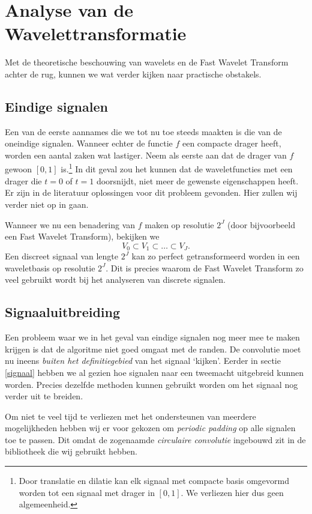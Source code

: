 \documentclass[11pt]{report}
\theoremstyle{plain}
\theoremstyle{remark}
\begin{document}
\section{Analyse van de Wavelettransformatie}
Met de theoretische beschouwing van wavelets en de Fast Wavelet Transform achter de rug, kunnen we wat verder kijken naar practische obstakels.

\subsection{Eindige signalen} 
Een van de eerste aannames die we tot nu toe steeds maakten is die van de oneindige signalen. Wanneer echter de functie $f$ een compacte drager heeft, worden een aantal zaken wat lastiger. Neem als eerste aan dat de drager van $f$ gewoon $[0,1]$ is.\footnote{Door translatie en dilatie kan elk signaal met compacte basis omgevormd worden tot een signaal met drager in $[0,1]$. We verliezen hier dus geen algemeenheid.} In dit geval zou het kunnen dat de waveletfuncties met een drager die $t=0$ of $t=1$ doorsnijdt, niet meer de gewenste eigenschappen heeft. Er zijn in de literatuur oplossingen voor dit probleem gevonden. Hier zullen wij verder niet op in gaan.

Wanneer we nu een benadering van $f$ maken op resolutie $2^J$ (door bijvoorbeeld een Fast Wavelet Transform), bekijken we
\[
	V_0 \subset V_{1} \subset \ldots \subset V_{J}.
\]
Een discreet signaal van lengte $2^{J}$ kan zo perfect getransformeerd worden in een waveletbasis op resolutie $2^{J}$. Dit is precies waarom de Fast Wavelet Transform zo veel gebruikt wordt bij het analyseren van discrete signalen.

\subsection{Signaaluitbreiding}
Een probleem waar we in het geval van eindige signalen nog meer mee te maken krijgen is dat de algoritme niet goed omgaat met de randen. De convolutie moet nu ineens \emph{buiten het definitiegebied} van het signaal `kijken'. Eerder in sectie \ref{signaal} hebben we al gezien hoe signalen naar een tweemacht uitgebreid kunnen worden. Precies dezelfde methoden kunnen gebruikt worden om het signaal nog verder uit te breiden. 

Om niet te veel tijd te verliezen met het ondersteunen van meerdere mogelijkheden hebben wij er voor gekozen om \emph{periodic padding} op alle signalen toe te passen. Dit omdat de zogenaamde \emph{circulaire convolutie} ingebouwd zit in de bibliotheek die wij gebruikt hebben.
\end{document}

